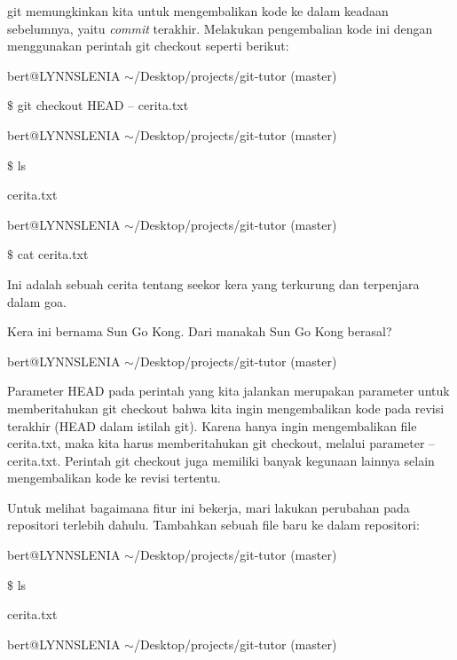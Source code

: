 \vspace{12pt}
git memungkinkan kita untuk mengembalikan kode ke dalam keadaan sebelumnya, yaitu \emph{commit} terakhir. Melakukan pengembalian kode ini dengan menggunakan perintah git checkout seperti berikut: \par
\noindent 
bert@LYNNSLENIA  $  \sim  $/Desktop/projects/git-tutor (master) \par
\noindent 
 $  \$  $ git checkout HEAD -- cerita.txt \par
\noindent 
bert@LYNNSLENIA  $  \sim  $/Desktop/projects/git-tutor (master) \par
\noindent 
 $  \$  $ ls \par
\noindent 
cerita.txt \par
\noindent 
bert@LYNNSLENIA  $  \sim  $/Desktop/projects/git-tutor (master) \par
\noindent 
 $  \$  $ cat cerita.txt \par
\noindent 
Ini adalah sebuah cerita tentang seekor kera yang terkurung dan terpenjara dalam goa. \par
\noindent 
Kera ini bernama Sun Go Kong. Dari manakah Sun Go Kong berasal? \par
\noindent 
bert@LYNNSLENIA  $  \sim  $/Desktop/projects/git-tutor (master) \par
\vspace{12pt}
Parameter HEAD pada perintah yang kita jalankan merupakan parameter untuk memberitahukan git checkout bahwa kita ingin mengembalikan kode pada revisi terakhir (HEAD dalam istilah git). Karena hanya ingin mengembalikan file cerita.txt, maka kita harus memberitahukan git checkout, melalui parameter -- cerita.txt. Perintah git checkout juga memiliki banyak kegunaan lainnya selain mengembalikan kode ke revisi tertentu.  \par
Untuk melihat bagaimana fitur ini bekerja, mari lakukan perubahan pada repositori terlebih dahulu. Tambahkan sebuah file baru ke dalam repositori: \par
\noindent 
{\fontsize{10pt}{10pt}\selectfont bert@LYNNSLENIA  $  \sim  $/Desktop/projects/git-tutor (master)} \par
\noindent 
{\fontsize{10pt}{10pt}\selectfont  $  \$  $ ls} \par
\noindent 
{\fontsize{10pt}{10pt}\selectfont cerita.txt} \par
\noindent 
\vspace{10pt}
\noindent 
{\fontsize{10pt}{10pt}\selectfont bert@LYNNSLENIA  $  \sim  $/Desktop/projects/git-tutor (master)} \par
